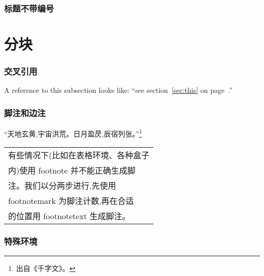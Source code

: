\documentclass[a4paper]{ctexart}
\begin{document}
\section*{标题不带编号}
\part{分块}
\section{交叉引用}
A reference to this subsection\label{sec:this} looks like: %
``see section~\ref{sec:this} on page~\pageref{sec:this}.''
\section{脚注和边注}
“天地玄黄,宇宙洪荒。日月盈昃,辰宿列张。”\footnote{出自《千字文》。}\par
\begin{tabular}{l}
\hline
有些情况下(比如在表格环境、各种盒子\\
内)使用 footnote 并不能正确生成脚\\
注。我们以分两步进行,先使用 \\
footnotemark 为脚注计数,再在合适\\
的位置用 footnotetext 生成脚注。\footnotemark\\
\hline
\end{tabular}
\section{特殊环境}
\end{document}

